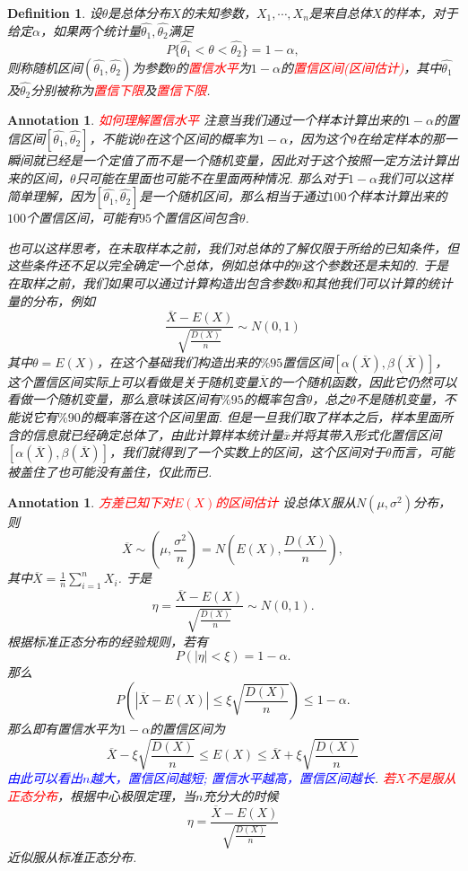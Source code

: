 \documentclass{article}
\newtheorem{definition}[theorem]{Definition}
\newtheorem{annotation}[theorem]{Annotation}
\newcommand{\redt}[1]{\textcolor{red}{#1}}
\newcommand{\bluet}[1]{\textcolor{blue}{#1}}
\begin{document}
\begin{definition}
\rm 设$\theta$是总体分布$X$的未知参数，$X_1,\cdots,X_n$是来自总体$X$的样本，对于给定$\alpha$，如果两个统计量$\widehat{\theta_1},\widehat{\theta_2}$满足
$$
P\{\widehat{\theta_1} < \theta < \widehat{\theta_2}\} = 1-\alpha,
$$
则称随机区间$(\widehat{\theta_1},\widehat{\theta_2})$为参数$\theta$的\redt{置信水平}为$1-\alpha$的\redt{置信区间(区间估计)}，其中$\widehat{\theta_1}$及$\widehat{\theta_2}$分别被称为\redt{置信下限}及\redt{置信下限}. 
\end{definition}

\begin{annotation}
\rm \redt{如何理解置信水平} 注意当我们通过一个样本计算出来的$1-\alpha$的置信区间$[\widehat{\theta_1},\widehat{\theta_2}]$，不能说$\theta$在这个区间的概率为$1-\alpha$，因为这个$\theta$在给定样本的那一瞬间就已经是一个定值了而不是一个随机变量，因此对于这个按照一定方法计算出来的区间，$\theta$只可能在里面也可能不在里面两种情况. 那么对于$1-\alpha$我们可以这样简单理解，因为$[\widehat{\theta_1},\widehat{\theta_2}]$是一个随机区间，那么相当于通过$100$个样本计算出来的$100$个置信区间，可能有$95$个置信区间包含$\theta$. 

也可以这样思考，在未取样本之前，我们对总体的了解仅限于所给的已知条件，但这些条件还不足以完全确定一个总体，例如总体中的$\theta$这个参数还是未知的. 于是在取样之前，我们如果可以通过计算构造出包含参数$\theta$和其他我们可以计算的统计量的分布，例如
$$
\frac{\overline{X}-E(X)}{\sqrt{\frac{D(X)}{n}}} \sim N(0,1)
$$
其中$\theta = E(X)$，在这个基础我们构造出来的$\%95$置信区间$[\alpha(\overline{X}),\beta(\overline{X})]$，这个置信区间实际上可以看做是关于随机变量$\overline{X}$的一个随机函数，因此它仍然可以看做一个随机变量，那么意味该区间有$\%95$的概率包含$\theta$，总之$\theta$不是随机变量，不能说它有$\%90$的概率落在这个区间里面. 但是一旦我们取了样本之后，样本里面所含的信息就已经确定总体了，由此计算样本统计量$\overline{x}$并将其带入形式化置信区间$[\alpha(\overline{X}),\beta(\overline{X})]$，我们就得到了一个实数上的区间，这个区间对于$\theta$而言，可能被盖住了也可能没有盖住，仅此而已. 
\end{annotation}

\begin{annotation}
\rm \redt{方差已知下对$E(X)$的区间估计} 设总体$X$服从$N(\mu,\sigma^2)$分布，则
$$
\overline{X} \sim \left(\mu, \frac{\sigma^2}{n}\right) = N\left(E(X),\frac{D(X)}{n}\right),
$$
其中$\overline{X}= \frac{1}{n}\sum\limits_{i=1}^n X_i$. 于是
$$
\eta = \frac{\overline{X}-E(X)}{\sqrt{\frac{D(X)}{n}}} \sim N(0,1). 
$$
根据标准正态分布的经验规则，若有
$$
P\left(|\eta| < \xi\right) = 1-\alpha.   
$$
那么
$$
P\left( |\overline{X}-E(X)| \leq \xi \sqrt{\frac{D(X)}{n}}   \right) \leq 1-\alpha.
$$
那么即有置信水平为$1-\alpha$的置信区间为
$$
\overline{X} - \xi \sqrt{\frac{D(X)}{n}} \leq E(X) \leq  \overline{X} + \xi \sqrt{\frac{D(X)}{n}}
$$
\bluet{由此可以看出$n$越大，置信区间越短; 置信水平越高，置信区间越长}. \redt{若$X$不是服从正态分布}，根据中心极限定理，当$n$充分大的时候
$$
\eta = \frac{\overline{X}-E(X)}{\sqrt{\frac{D(X)}{n}}}
$$
近似服从标准正态分布. 
\end{annotation}
\end{document}
